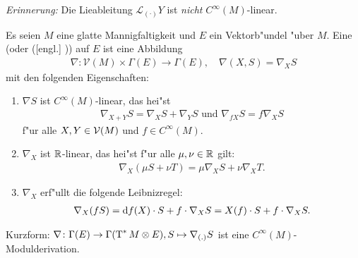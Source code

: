 \emph{Erinnerung:} Die Lieableitung $\mathcal L_{(\cdot)}Y$ ist \emph{nicht} $C^{\infty}(M)$-linear.

\begin{Dfn}
  Es seien $M$ eine glatte Mannigfaltigkeit und $E$ ein Vektorb"undel "uber $M$.
  Eine  (oder  ([engl.] )) auf $E$ ist eine Abbildung
  \begin{align*}
    \nabla \colon \mathcal V(M) \times \Gamma(E) \to \Gamma(E), \quad \nabla(X,S) = \nabla_XS
  \end{align*}
  mit den folgenden Eigenschaften:
  \begin{enumerate}[label=(\roman*),widest=iii]
  \item $\nabla S$ ist $C^{\infty}(M)$-linear, das hei"st
    \begin{align*}
      \nabla_{X+Y}S = \nabla_XS+\nabla_YS \text{ und } \nabla_{fX}S = f\nabla_XS
    \end{align*}
    f"ur alle $X, Y \in \operatorname{\mathcal{V}}(M)$ und $f \in C^{\infty}(M)$.
  \item $\nabla_X$ ist $\operatorname{\mathbb{R}}$-linear, das hei"st f"ur alle $\mu, \nu \in \operatorname{\mathbb{R}}$ gilt:
    \begin{align*}
      \nabla_X(\mu S + \nu T) = \mu\nabla_XS + \nu\nabla_XT.
    \end{align*}
  \item $\nabla_X$ erf"ullt die folgende Leibnizregel:
    \begin{align*}
      \nabla_X(fS) = \mathrm{d} f(X) \cdot S + f\cdot \nabla_XS = X(f)\cdot S + f \cdot \nabla_XS.
    \end{align*}
  \end{enumerate}
  Kurzform: $\nabla \colon \Gamma(E) \to \Gamma(\operatorname{T}^{*}M \otimes E), S \mapsto \nabla_{(.)}S$ ist eine $C^{\infty}(M)$-Modulderivation.
\end{Dfn}

